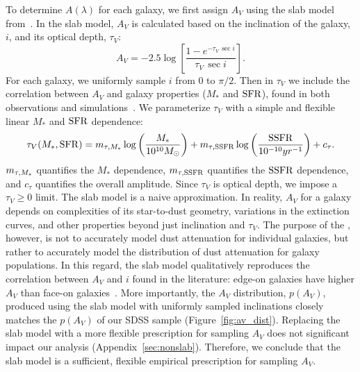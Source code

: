 To determine $A(\lambda)$ for each galaxy, we first assign $A_V$ using the slab
model from~\cite{somerville1999, somerville2012}. In the slab model, $A_V$ is
calculated based on the inclination of the galaxy, $i$, and its optical depth, $\tau_V$: 
\begin{equation} \label{eq:slab}
    A_V = -2.5 \log \left[ \frac{1 - e^{-\tau_V\,\sec i}}{\tau_V\,\sec i} \right].
\end{equation}
For each galaxy, we uniformly sample $i$ from 0 to $\pi/2$. Then in $\tau_V$ we
include the correlation between $A_V$ and galaxy properties ($M_*$ and ${\rm SFR}$),
found in both observations and simulations~\citep[\eg][]{narayanan2018, salim2020}. 
We parameterize $\tau_V$ with a simple and flexible linear $M_*$ and ${\rm SFR}$ 
dependence:
\begin{equation} \label{eq:tauv}
    \tau_V(M_*, \sfr) = \mtaum \log \left(\frac{M_*}{10^{10} M_\odot}\right) +
    \mtaus \log \left(\frac{\ssfr}{10^{-10}yr^{-1}}\right) + c_\tau.
\end{equation}
$m_{\tau,M_*}$ quantifies the $M_*$ dependence, $m_{\tau,{\rm SSFR}}$ quantifies the ${\rm SSFR}$
dependence, and $c_\tau$ quantifies the overall amplitude. Since $\tau_V$ is
optical depth, we impose a $\tau_V \ge 0$ limit. The slab model is a naive 
approximation. In reality, $A_V$ for a galaxy depends on complexities 
of its star-to-dust geometry, variations in the extinction curves, and other
properties beyond just inclination and $\tau_V$. The purpose of the \eda,
however, is not to accurately model dust attenuation for individual galaxies,
but rather to accurately model the distribution of dust attenuation for galaxy
populations. In this regard, the slab model qualitatively reproduces the
correlation between $A_V$ and $i$ found in the literature: edge-on galaxies
have higher $A_V$ than face-on galaxies~\citep[\eg][]{conroy2010, wild2011,
battisti2017, salim2020}. More
importantly, the $A_V$ distribution, $p(A_V)$, produced using the slab model with
uniformly sampled inclinations closely matches the $p(A_V)$ of our SDSS sample
(Figure~\ref{fig:av_dist}). Replacing the slab model with a more flexible
prescription for sampling $A_V$ does not significant impact our analysis 
(Appendix~\ref{sec:nonslab}). Therefore, we conclude that the slab model is a
sufficient, flexible empirical prescription for sampling $A_V$. 


